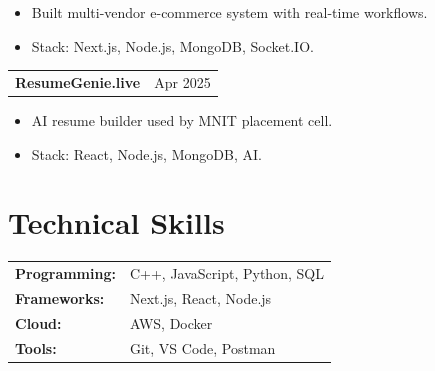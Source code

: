 \documentclass[a4paper,10pt]{article}
\begin{document}
\vspace{-8pt}

\begin{itemize}[nosep, leftmargin=1.5em]

\item Built multi-vendor e-commerce system with real-time workflows.

\item Stack: Next.js, Node.js, MongoDB, Socket.IO.

\end{itemize}



\begin{tabularx}{\linewidth}{ @{}l r@{} }

\textbf{ResumeGenie.live} & \textcolor[HTML]{371e77}{Apr 2025} \\

\end{tabularx}

\vspace{-8pt}

\begin{itemize}[nosep, leftmargin=1.5em]

\item AI resume builder used by MNIT placement cell.

\item Stack: React, Node.js, MongoDB, AI.

\end{itemize}




\section{Technical Skills}

\begin{tabularx}{\linewidth}{@{}l X@{}}

\textbf{Programming:} & C++, JavaScript, Python, SQL \\

\textbf{Frameworks:} & Next.js, React, Node.js \\

\textbf{Cloud:} & AWS, Docker \\

\textbf{Tools:} & Git, VS Code, Postman \\

\end{tabularx}
\end{document}
